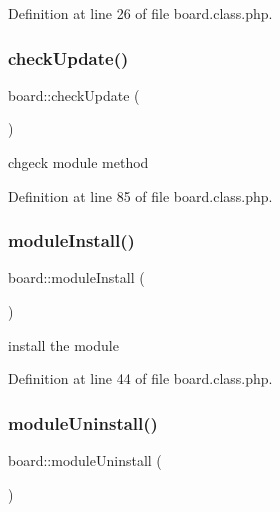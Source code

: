 Definition at line 26 of file board.\+class.\+php.

\hypertarget{classboard_a64506bb5293024e146d0ff7deeb27684}{}\label{classboard_a64506bb5293024e146d0ff7deeb27684} 
\subsubsection{\texorpdfstring{check\+Update()}{checkUpdate()}}
{\footnotesize\ttfamily board\+::check\+Update (\begin{DoxyParamCaption}{ }\end{DoxyParamCaption})}



chgeck module method 



Definition at line 85 of file board.\+class.\+php.

\hypertarget{classboard_abcf015f709c0c2809dba55f74f059ebc}{}\label{classboard_abcf015f709c0c2809dba55f74f059ebc} 
\subsubsection{\texorpdfstring{module\+Install()}{moduleInstall()}}
{\footnotesize\ttfamily board\+::module\+Install (\begin{DoxyParamCaption}{ }\end{DoxyParamCaption})}



install the module 



Definition at line 44 of file board.\+class.\+php.

\hypertarget{classboard_a1e6008fcf4e2a540370e242246b8e721}{}\label{classboard_a1e6008fcf4e2a540370e242246b8e721} 
\subsubsection{\texorpdfstring{module\+Uninstall()}{moduleUninstall()}}
{\footnotesize\ttfamily board\+::module\+Uninstall (\begin{DoxyParamCaption}{ }\end{DoxyParamCaption})}



